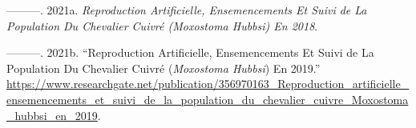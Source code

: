 \documentclass[9pt,twocolumn,twoside,]{pnas-new}
\newlength{\cslhangindent}
\newenvironment{CSLReferences}[2] %
 {\begin{list}{}{%
  \setlength{\itemindent}{0pt}
  \setlength{\leftmargin}{0pt}
  \setlength{\parsep}{0pt}
  \ifodd #1
   \setlength{\leftmargin}{\cslhangindent}
   \setlength{\itemindent}{-1\cslhangindent}
  \fi
  \setlength{\itemsep}{#2\baselineskip}}}
 {\end{list}}
\begin{document}
\begin{CSLReferences}{1}{0}
---------. 2021a. \emph{Reproduction Artificielle, Ensemencements Et
Suivi de La Population Du Chevalier Cuivré (\emph{{Moxostoma} Hubbsi})
En 2018}.

---------. 2021b. {``Reproduction Artificielle, Ensemencements Et Suivi
de La Population Du Chevalier Cuivré (\emph{{Moxostoma} Hubbsi}) En
2019.''}
\url{https://www.researchgate.net/publication/356970163_Reproduction_artificielle_ensemencements_et_suivi_de_la_population_du_chevalier_cuivre_Moxostoma_hubbsi_en_2019}.

\end{CSLReferences}



% 
\end{document}
